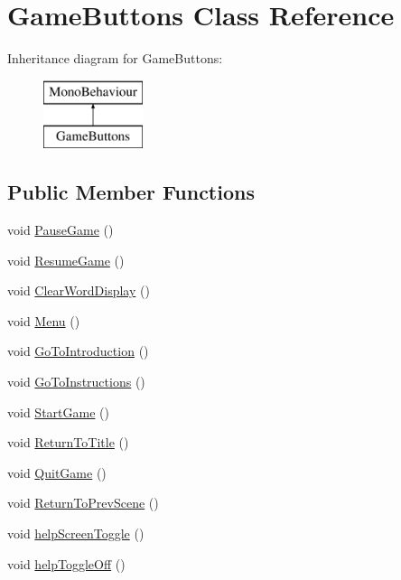 \hypertarget{class_game_buttons}{}\section{Game\+Buttons Class Reference}
\label{class_game_buttons}
Inheritance diagram for Game\+Buttons\+:\begin{figure}[H]
\begin{center}
\leavevmode
\includegraphics[height=2.000000cm]{class_game_buttons}
\end{center}
\end{figure}
\subsection*{Public Member Functions}
\begin{DoxyCompactItemize}
\item 
void \hyperlink{class_game_buttons_aa6666b810a7a0caff54b55d473be24c9}{Pause\+Game} ()
\item 
void \hyperlink{class_game_buttons_af088dcf9d9b5393c1c22bf2122cffe35}{Resume\+Game} ()
\item 
void \hyperlink{class_game_buttons_aa55857210a186acda2b262d2cab348b8}{Clear\+Word\+Display} ()
\item 
void \hyperlink{class_game_buttons_a64856a3c989ce3d14db961766db49425}{Menu} ()
\item 
void \hyperlink{class_game_buttons_a53eb5843078798e6617647ae83bfbc1e}{Go\+To\+Introduction} ()
\item 
void \hyperlink{class_game_buttons_ac91982c8a1409e977ceb47220fd7112a}{Go\+To\+Instructions} ()
\item 
void \hyperlink{class_game_buttons_acfb2c2af597071c65abe2535199bf5d9}{Start\+Game} ()
\item 
void \hyperlink{class_game_buttons_aa24ecd9e57ec9e74b94d2e974655c630}{Return\+To\+Title} ()
\item 
void \hyperlink{class_game_buttons_a0bf79754f2ddf3fcc4059e9179b74024}{Quit\+Game} ()
\item 
void \hyperlink{class_game_buttons_a38fd8fbd392123bfa94d3a291afd725e}{Return\+To\+Prev\+Scene} ()
\item 
void \hyperlink{class_game_buttons_a1ca7b15fb784ed277bc107613d95606d}{help\+Screen\+Toggle} ()
\item 
void \hyperlink{class_game_buttons_a2a81335687a2eb013f83fccf7394f57d}{help\+Toggle\+Off} ()
\end{DoxyCompactItemize}
